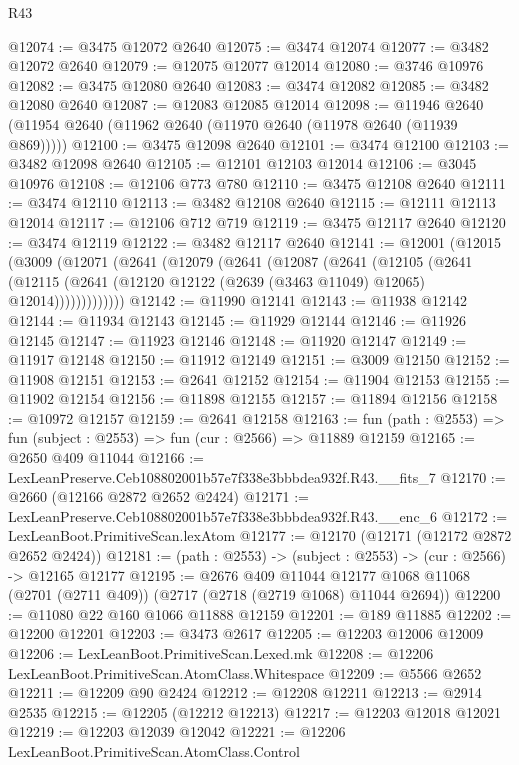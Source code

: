 \begin{lexlean}{R43}
\begin{coremodule}
@12074 := @3475 @12072 @2640
@12075 := @3474 @12074
@12077 := @3482 @12072 @2640
@12079 := @12075 @12077 @12014
@12080 := @3746 @10976
@12082 := @3475 @12080 @2640
@12083 := @3474 @12082
@12085 := @3482 @12080 @2640
@12087 := @12083 @12085 @12014
@12098 := @11946 @2640 (@11954 @2640 (@11962 @2640 (@11970 @2640 (@11978 @2640 (@11939 @869)))))
@12100 := @3475 @12098 @2640
@12101 := @3474 @12100
@12103 := @3482 @12098 @2640
@12105 := @12101 @12103 @12014
@12106 := @3045 @10976
@12108 := @12106 @773 @780
@12110 := @3475 @12108 @2640
@12111 := @3474 @12110
@12113 := @3482 @12108 @2640
@12115 := @12111 @12113 @12014
@12117 := @12106 @712 @719
@12119 := @3475 @12117 @2640
@12120 := @3474 @12119
@12122 := @3482 @12117 @2640
@12141 := @12001
    (@12015
      (@3009
        (@12071
          (@2641
            (@12079
              (@2641
                (@12087
                  (@2641
                    (@12105
                      (@2641
                        (@12115
                          (@2641 (@12120 @12122 (@2639 (@3463 @11049) @12065) @12014)))))))))))))
@12142 := @11990 @12141
@12143 := @11938 @12142
@12144 := @11934 @12143
@12145 := @11929 @12144
@12146 := @11926 @12145
@12147 := @11923 @12146
@12148 := @11920 @12147
@12149 := @11917 @12148
@12150 := @11912 @12149
@12151 := @3009 @12150
@12152 := @11908 @12151
@12153 := @2641 @12152
@12154 := @11904 @12153
@12155 := @11902 @12154
@12156 := @11898 @12155
@12157 := @11894 @12156
@12158 := @10972 @12157
@12159 := @2641 @12158
@12163 := fun (path : @2553) => fun (subject : @2553) => fun (cur : @2566) => @11889 @12159
@12165 := @2650 @409 @11044
@12166 := LexLeanPreserve.Ceb108802001b57e7f338e3bbbdea932f.R43.__fits_7
@12170 := @2660 (@12166 @2872 @2652 @2424)
@12171 := LexLeanPreserve.Ceb108802001b57e7f338e3bbbdea932f.R43.__enc_6
@12172 := LexLeanBoot.PrimitiveScan.lexAtom
@12177 := @12170 (@12171 (@12172 @2872 @2652 @2424))
@12181 := (path : @2553) -> (subject : @2553) -> (cur : @2566) -> @12165 @12177
@12195 := @2676
    @409
    @11044
    @12177
    @1068
    @11068
    (@2701 (@2711 @409))
    (@2717 (@2718 (@2719 @1068) @11044 @2694))
@12200 := @11080 @22 @160 @1066 @11888 @12159
@12201 := @189 @11885
@12202 := @12200 @12201
@12203 := @3473 @2617
@12205 := @12203 @12006 @12009
@12206 := LexLeanBoot.PrimitiveScan.Lexed.mk
@12208 := @12206 LexLeanBoot.PrimitiveScan.AtomClass.Whitespace
@12209 := @5566 @2652
@12211 := @12209 @90 @2424
@12212 := @12208 @12211
@12213 := @2914 @2535
@12215 := @12205 (@12212 @12213)
@12217 := @12203 @12018 @12021
@12219 := @12203 @12039 @12042
@12221 := @12206 LexLeanBoot.PrimitiveScan.AtomClass.Control

\end{coremodule}
\end{lexlean}
